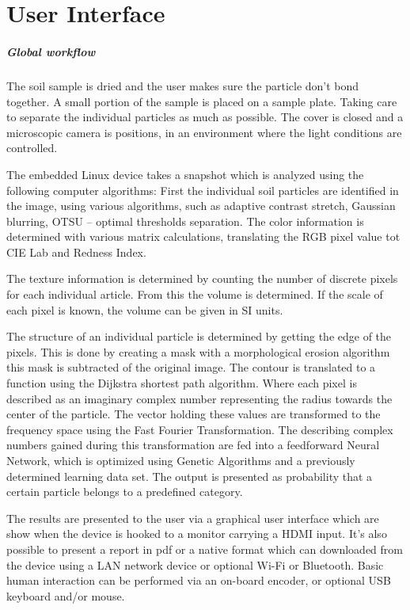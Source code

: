 \documentclass[11pt,fleqn,,a4paper,twoside,openright]{book}
\begin{document}
\chapter{User Interface}\label{UserInterface}
\paragraph{Global workflow}
The soil sample is dried and the user makes sure the particle don’t bond together. A small portion of the sample is placed on a sample plate. Taking care to separate the individual particles as much as possible. The cover is closed and a microscopic camera is positions, in an environment where the light conditions are controlled.

The embedded Linux device takes a snapshot which is analyzed using the following computer algorithms: First the individual soil particles are identified in the image, using various algorithms, such as adaptive contrast stretch, Gaussian blurring, OTSU – optimal thresholds separation. The color information is determined with various matrix calculations, translating the RGB pixel value tot CIE Lab and Redness Index.

The texture information is determined by counting the number of discrete pixels for each individual article. From this the volume is determined. If the scale of each pixel is known, the volume can be given in SI units.

The structure of an individual particle is determined by getting the edge of the pixels. This is done by creating a mask with a morphological erosion algorithm this mask is subtracted of the original image. The contour is translated to a function using the Dijkstra shortest path algorithm. Where each pixel is described as an imaginary complex number representing the radius towards the center of the particle. The vector holding these values are transformed to the frequency space using the Fast Fourier Transformation. The describing complex numbers gained during this transformation are fed into a feedforward Neural Network, which is optimized using Genetic Algorithms and a previously determined learning data set. The output is presented as probability that a certain particle belongs to a predefined category.

The results are presented to the user via a graphical user interface which are show when the device is hooked to a monitor carrying a HDMI input. It’s also possible to present a report in pdf or a native format which can downloaded from the device using a LAN network device or optional Wi-Fi or Bluetooth. Basic human interaction can be performed via an on-board encoder, or optional USB keyboard and/or mouse.
\end{document}

